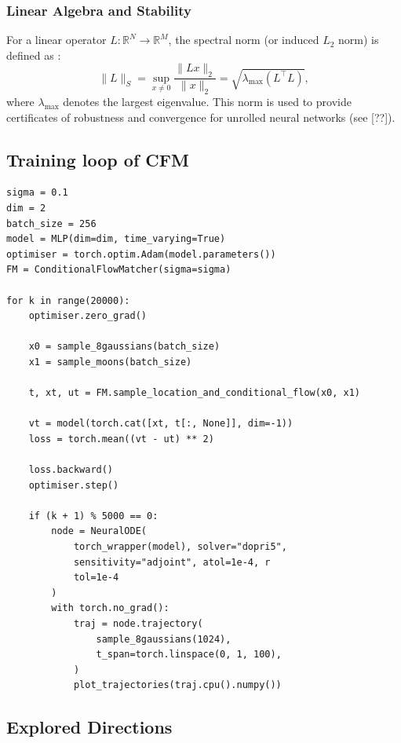 \documentclass[a4paper,11pt]{article}
\newcommand{\RR}{\ensuremath{\mathbb{R}}}
\theoremstyle{plain}{\theorembodyfont{\rmfamily}%
\newtheorem{proposition}[theorem]{Proposition}}
\theoremstyle{plain}{\theorembodyfont{\rmfamily}%
\newtheorem{notation}[theorem]{Notation}}
\theoremstyle{plain}{\theorembodyfont{\rmfamily}%
\newtheorem{assumption}[theorem]{Assumption}}
\theoremstyle{plain}{\theorembodyfont{\rmfamily}%
\newtheorem{problem}[theorem]{Problem}}
\theoremstyle{plain}{\theorembodyfont{\rmfamily}%
\newtheorem{example}[theorem]{Example}}
\theoremstyle{plain}{\theorembodyfont{\rmfamily}%
\newtheorem{remark}[theorem]{Remark}}
\theoremstyle{plain}{\theorembodyfont{\rmfamily}%
\newtheorem{definition}[theorem]{Definition}}
\theoremstyle{plain}{\theorembodyfont{\rmfamily}%
\newtheorem{question}[theorem]{Question}}
\numberwithin{equation}{section}
\begin{document}
\subsubsection{Linear Algebra and Stability}

\begin{definition}
For a linear operator $L: \RR^{N} \to \RR^{M}$, the spectral norm (or induced $L_2$ norm) is defined as \cite{golub2013matrix}:
\begin{equation}
    \| L \|_S = \sup_{x \neq 0} \frac{\| Lx \|_2}{\| x \|_2} = \sqrt{\lambda_{\max}(L^\top L)},
\end{equation}
where $\lambda_{\max}$ denotes the largest eigenvalue. This norm is used to provide certificates of robustness and convergence for unrolled neural networks (see [??]).
\end{definition}

\subsection{Training loop of CFM}
\label{sec:code}

\begin{verbatim}
sigma = 0.1
dim = 2
batch_size = 256
model = MLP(dim=dim, time_varying=True)
optimiser = torch.optim.Adam(model.parameters())
FM = ConditionalFlowMatcher(sigma=sigma)

for k in range(20000):
    optimiser.zero_grad()

    x0 = sample_8gaussians(batch_size)
    x1 = sample_moons(batch_size)

    t, xt, ut = FM.sample_location_and_conditional_flow(x0, x1)

    vt = model(torch.cat([xt, t[:, None]], dim=-1))
    loss = torch.mean((vt - ut) ** 2)

    loss.backward()
    optimiser.step()

    if (k + 1) % 5000 == 0:
        node = NeuralODE(
            torch_wrapper(model), solver="dopri5", 
            sensitivity="adjoint", atol=1e-4, r
            tol=1e-4
        )
        with torch.no_grad():
            traj = node.trajectory(
                sample_8gaussians(1024),
                t_span=torch.linspace(0, 1, 100),
            )
            plot_trajectories(traj.cpu().numpy())
\end{verbatim}

\subsection{Explored Directions}
\label{sec:explored}
\end{document}
